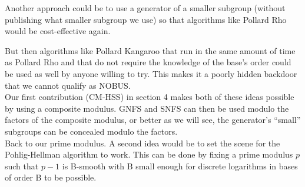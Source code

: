 \documentclass[a4paper,11pt,twocolumn]{article}
\begin{document}
Another approach could be to use a generator of a smaller subgroup (without publishing what smaller subgroup we use) so that algorithms like Pollard Rho would be cost-effective again.

\begin{center}
\end{center}

But then algorithms like Pollard Kangaroo that run in the same amount of time as Pollard Rho and that do not require the knowledge of the base's order could be used as well by anyone willing to try. This makes it a poorly hidden backdoor that we cannot qualify as NOBUS.\\

Our first contribution (CM-HSS) in section 4 makes both of these ideas possible by using a composite modulus. GNFS and SNFS can then be used modulo the factors of the composite modulus, or better as we will see, the generator's ``small'' subgroups can be concealed modulo the factors.\\

Back to our prime modulus. A second idea would be to set the scene for the Pohlig-Hellman algorithm to work. This can be done by fixing a prime modulus $p$ such that $p-1$ is B-smooth  with B small enough for discrete logarithms in bases of order B to be possible.\\

\begin{center}
\end{center}
\end{document}
